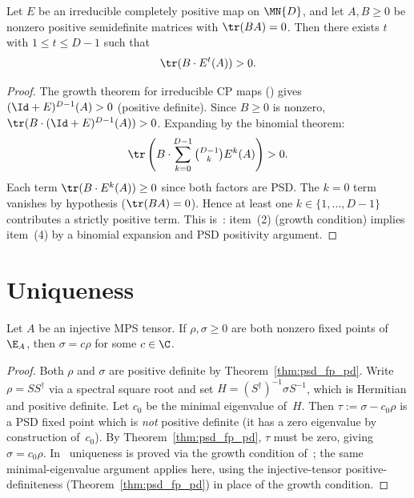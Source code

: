\begin{theorem}\label{thm:orthogonal_trace_cond}
    \leanok
    Let $E$ be an irreducible completely positive map on $\MN{D}$,
    and let $A, B \ge 0$ be nonzero positive semidefinite matrices
    with $\tr(B A) = 0$.
    Then there exists $t$ with $1 \le t \le D - 1$ such that
    \[
        \tr(B \cdot E^t(A)) > 0.
    \]
\end{theorem}

\begin{proof}
    \leanok
    The growth theorem for irreducible CP maps
    (\cite[Theorem~6.2(2)]{Wolf2012Quantum}) gives
    $(\Id + E)^{D-1}(A) > 0$ (positive definite).
    Since $B \ge 0$ is nonzero,
    $\tr(B \cdot (\Id + E)^{D-1}(A)) > 0$.
    Expanding by the binomial theorem:
    \[
        \tr\left(B \cdot \sum_{k=0}^{D-1} \tbinom{D-1}{k} E^k(A)\right) > 0.
    \]
    Each term $\tr(B \cdot E^k(A)) \ge 0$ since both factors are PSD.
    The $k = 0$ term vanishes by hypothesis
    ($\tr(B A) = 0$).
    Hence at least one $k \in \{1, \ldots, D-1\}$ contributes
    a strictly positive term.
    This is~\cite[Theorem~6.2(4)]{Wolf2012Quantum}:
    item~(2) (growth condition) implies item~(4)
    by a binomial expansion and PSD positivity argument.
\end{proof}

\section{Uniqueness}

\begin{theorem}\label{thm:psd_fp_unique}
    \leanok
    Let $A$ be an injective MPS tensor.
    If $\rho, \sigma \ge 0$ are both nonzero fixed points of
    $\E_A$, then $\sigma = c \rho$ for some $c \in \C$.
\end{theorem}

\begin{proof}
    \leanok
    Both $\rho$ and $\sigma$ are positive definite by
    Theorem~\ref{thm:psd_fp_pd}.
    Write $\rho = S S^\dagger$ via a spectral square root and set
    $H = (S^\dagger)^{-1} \sigma S^{-1}$, which is Hermitian
    and positive definite.
    Let $c_0$ be the minimal eigenvalue of~$H$.
    Then $\tau := \sigma - c_0 \rho$ is a PSD fixed point
    which is \emph{not} positive definite
    (it has a zero eigenvalue by construction of~$c_0$).
    By Theorem~\ref{thm:psd_fp_pd}, $\tau$ must be zero,
    giving $\sigma = c_0 \rho$.
    In~\cite[Theorem~6.3, item~2]{Wolf2012Quantum} uniqueness is proved
    via the growth condition of~\cite[Theorem~6.2]{Wolf2012Quantum};
    the same minimal-eigenvalue argument applies here, using the
    injective-tensor positive-definiteness
    (Theorem~\ref{thm:psd_fp_pd}) in place of the growth condition.
\end{proof}

